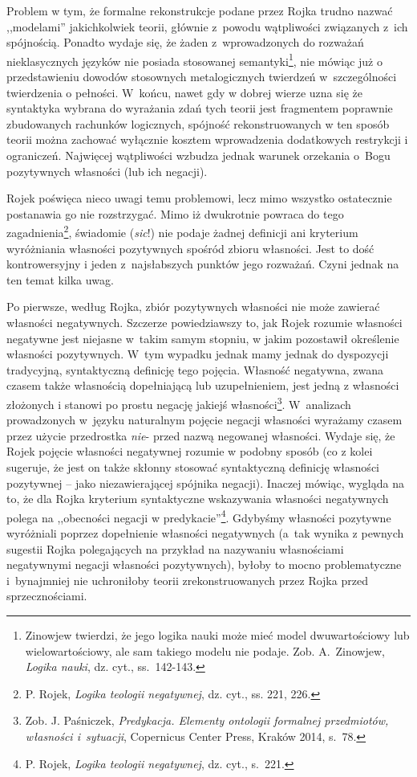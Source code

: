 Problem w tym, że formalne rekonstrukcje podane przez Rojka trudno nazwać
,,modelami'' jakichkolwiek teorii, głównie z~powodu wątpliwości
związanych z~ich spójnością. Ponadto wydaje się, że żaden z~wprowadzonych do
rozważań nieklasycznych języków nie posiada stosowanej semantyki\footnote{Zinowjew twierdzi, że jego
logika nauki może mieć model dwuwartościowy lub wielowartościowy, ale sam takiego modelu nie podaje. Zob.
A.~Zinowjew, \textit{Logika nauki}, dz. cyt., ss.~142-143.},
nie mówiąc już o przedstawieniu dowodów stosownych metalogicznych twierdzeń
w~szczególności twierdzenia o pełności.
W~końcu, nawet gdy w dobrej wierze uzna się że syntaktyka wybrana do wyrażania
zdań tych teorii jest  fragmentem poprawnie zbudowanych rachunków logicznych,
spójność rekonstruowanych w ten sposób teorii można zachować wyłącznie kosztem wprowadzenia dodatkowych restrykcji
i ograniczeń. Najwięcej wątpliwości wzbudza jednak
warunek orzekania o~Bogu pozytywnych
własności (lub ich negacji).




Rojek poświęca nieco uwagi temu problemowi, lecz mimo wszystko ostatecznie
postanawia go nie rozstrzygać.
Mimo iż dwukrotnie powraca do tego zagadnienia\footnote{P. Rojek, \textit{Logika teologii negatywnej}, dz. cyt.,
ss. 221, 226. }, świadomie (\textit{sic}!) nie podaje żadnej definicji
ani kryterium wyróżniania własności pozytywnych spośród zbioru
własności. Jest to dość kontrowersyjny i jeden z~najsłabszych
punktów jego rozważań.
Czyni jednak na ten temat kilka uwag.




Po pierwsze, według Rojka, zbiór pozytywnych własności nie może zawierać
własności negatywnych. Szczerze powiedziawszy to, jak Rojek rozumie własności negatywne jest niejasne
w~takim samym stopniu, w jakim pozostawił określenie własności pozytywnych. W~tym wypadku
jednak mamy jednak do dyspozycji tradycyjną, syntaktyczną definicję tego pojęcia.
Własność negatywna, zwana czasem także własnością dopełniającą lub uzupełnieniem, jest
jedną z własności złożonych i stanowi po prostu negację jakiejś
własności\footnote{Zob. J. Paśniczek, \textit{Predykacja. Elementy ontologii formalnej przedmiotów, własności i~sytuacji}, Copernicus
Center Press, Kraków 2014, s.~78.}. W~analizach prowadzonych
w~języku naturalnym pojęcie negacji własności wyrażamy czasem przez użycie
przedrostka \textit{nie}-  przed nazwą negowanej własności. Wydaje się, że Rojek pojęcie
własności negatywnej rozumie w podobny sposób (co z kolei sugeruje, że jest on także skłonny
stosować syntaktyczną definicję własności pozytywnej -- jako
niezawierającej spójnika negacji).
Inaczej mówiąc, wygląda na to, że dla Rojka kryterium
syntaktyczne wskazywania własności negatywnych polega na ,,obecności negacji w
predykacie''\footnote{P. Rojek, \textit{Logika teologii negatywnej}, dz. cyt., s.~221. }. Gdybyśmy własności pozytywne wyróżniali poprzez dopełnienie własności negatywnych (a~tak wynika z pewnych sugestii Rojka polegających na przykład  na nazywaniu własnościami negatywnymi negacji własności pozytywnych), byłoby to mocno problematyczne i~bynajmniej nie uchroniłoby
teorii zrekonstruowanych przez Rojka przed sprzecznościami.

